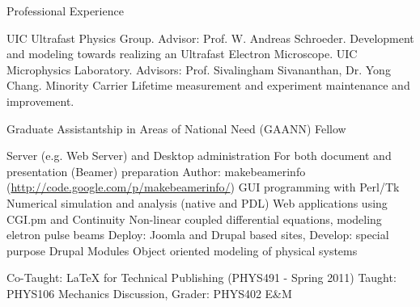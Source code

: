 \begin{rubric}{Professional Experience}


  \entry*[2005 --- \ldots] UIC Ultrafast Physics Group. Advisor: Prof. W. Andreas Schroeder. Development and modeling towards realizing an Ultrafast Electron Microscope.
  \entry*[2003 --- 2005] UIC Microphysics Laboratory. Advisors: Prof. Sivalingham Sivananthan, Dr. Yong Chang. Minority Carrier Lifetime measurement and experiment maintenance and improvement.


  \entry*[8/2007 --- 7/2010] Graduate Assistantship in Areas of National Need (GAANN) Fellow


  \entry*[Linux] Server (e.g. Web Server) and Desktop administration
  \entry*[\LaTeX] For both document and presentation (Beamer) preparation
  \entry*[Perl] Author: makebeamerinfo (\url{http://code.google.com/p/makebeamerinfo/})
  \entry*[Perl] GUI programming with Perl/Tk
  \entry*[Perl] Numerical simulation and analysis (native and PDL)
  \entry*[Perl] Web applications using CGI.pm and Continuity
  \entry*[Mathematica] Non-linear coupled differential equations, modeling eletron pulse beams
  \entry*[PHP] Deploy: Joomla and Drupal based sites, Develop: special purpose Drupal Modules
  \entry*[Modelica] Object oriented modeling of physical systems
  

  \entry*[Teaching] Co-Taught: \LaTeX{} for Technical Publishing (PHYS491 - Spring 2011)
  \entry*[T.A.] Taught: PHYS106 Mechanics Discussion, Grader: PHYS402 E\&M

\end{rubric}

